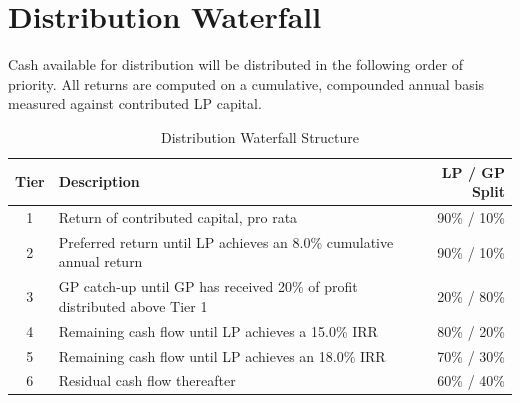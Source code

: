 \section{Distribution Waterfall}
Cash available for distribution will be distributed in the following order of priority. All
returns are computed on a cumulative, compounded annual basis measured against contributed LP
capital.

\begin{table}[H]
\centering
\caption{Distribution Waterfall Structure}
\label{tab:waterfall}
\vspace{4pt}
\begin{tabularx}{\linewidth}{c X r}
\toprule
\rowcolor{jvnavy}
\textbf{\color{white}Tier} & \textbf{\color{white}Description} & \textbf{\color{white}LP / GP Split} \\
\midrule
1 & Return of contributed capital, pro rata & 90\% / 10\% \\
\rowcolor{jvcream}
2 & Preferred return until LP achieves an 8.0\% cumulative annual return & 90\% / 10\% \\
3 & GP catch-up until GP has received 20\% of profit distributed above Tier 1 & 20\% / 80\% \\
\rowcolor{jvcream}
4 & Remaining cash flow until LP achieves a 15.0\% IRR & 80\% / 20\% \\
5 & Remaining cash flow until LP achieves an 18.0\% IRR & 70\% / 30\% \\
\rowcolor{jvcream}
6 & Residual cash flow thereafter & 60\% / 40\% \\
\bottomrule
\end{tabularx}
\end{table}

